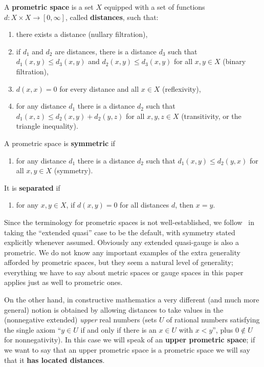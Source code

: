 \documentclass{article}
\def\Rp{[0,\infty]}
\begin{document}
\begin{defn}
  A \textbf{prometric space} is a set $X$ equipped with a set of functions $d:X\times X\to\Rp$, called \textbf{distances}, such that:
  \begin{enumerate}
  \item there exists a distance (nullary filtration),
  \item if $d_1$ and $d_2$ are distances, there is a distance $d_3$ such that $d_1(x,y)\le d_3(x,y)$ and $d_2(x,y)\le d_3(x,y)$ for all $x,y\in X$ (binary filtration),
  \item $d(x,x)=0$ for every distance and all $x\in X$ (reflexivity),
  \item for any distance $d_1$ there is a distance $d_2$ such that $d_1(x,z)\le d_2(x,y)+d_2(y,z)$ for all $x,y,z\in X$ (transitivity, or the triangle inequality).
  \end{enumerate}
  A prometric space is \textbf{symmetric} if
  \begin{enumerate}[resume]
  \item for any distance $d_1$ there is a distance $d_2$ such that $d_1(x,y)\le d_2(y,x)$ for all $x,y\in X$ (symmetry).
  \end{enumerate}
  It is \textbf{separated} if
  \begin{enumerate}[resume]
  \item for any $x,y\in X$, if $d(x,y)=0$ for all distances $d$, then $x=y$.
  \end{enumerate}
\end{defn}

Since the terminology for prometric spaces is not well-established, we follow~\cite{cht:one-setting} in taking the ``extended quasi'' case to be the default, with symmetry stated explicitly whenever assumed.
Obviously any extended quasi-gauge is also a prometric.
We do not know any important examples of the extra generality afforded by prometric spaces, but they seem a natural level of generality; everything we have to say about metric spaces or gauge spaces in this paper applies just as well to prometric ones.

On the other hand, in constructive mathematics a very different (and much more general) notion is obtained by allowing distances to take values in the (nonnegative extended) \emph{upper} real numbers (sets $U$ of rational numbers satisfying the single axiom ``$y\in U$ if and only if there is an $x\in U$ with $x<y$'', plus $0\notin U$ for nonnegativity).
In this case we will speak of an \textbf{upper prometric space}; if we want to say that an upper prometric space is a prometric space we will say that it \textbf{has located distances}.
\end{document}
